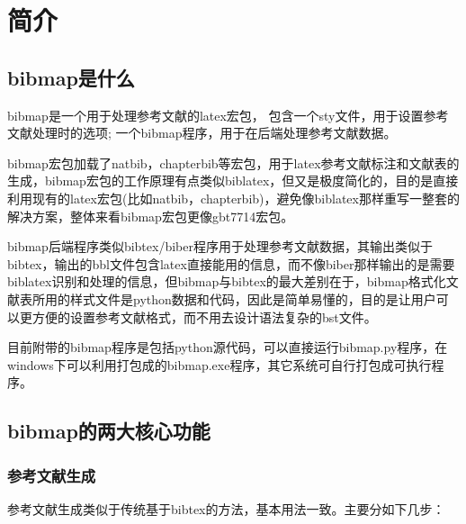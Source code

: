 \documentclass{article}
\begin{document}
\thispagestyle{empty}
\begin{center}

\vspace{0.3cm}


\end{center}

\section{简介}

\subsection{bibmap是什么}

bibmap是一个用于处理参考文献的latex宏包，
包含一个sty文件，用于设置参考文献处理时的选项;
一个bibmap程序，用于在后端处理参考文献数据。

bibmap宏包加载了natbib，chapterbib等宏包，用于latex参考文献标注和文献表的生成，bibmap宏包的工作原理有点类似biblatex，但又是极度简化的，目的是直接利用现有的latex宏包(比如natbib，chapterbib)，避免像biblatex那样重写一整套的解决方案，整体来看bibmap宏包更像gbt7714宏包。

bibmap后端程序类似bibtex/biber程序用于处理参考文献数据，其输出类似于bibtex，输出的bbl文件包含latex直接能用的信息，而不像biber那样输出的是需要biblatex识别和处理的信息，但bibmap与bibtex的最大差别在于，bibmap格式化文献表所用的样式文件是python数据和代码，因此是简单易懂的，目的是让用户可以更方便的设置参考文献格式，而不用去设计语法复杂的bst文件。

目前附带的bibmap程序是包括python源代码，可以直接运行bibmap.py程序，在windows下可以利用打包成的bibmap.exe程序，其它系统可自行打包成可执行程序。

\subsection{bibmap的两大核心功能}

\subsubsection{参考文献生成}

参考文献生成类似于传统基于bibtex的方法，基本用法一致。主要分如下几步：
\end{document}
